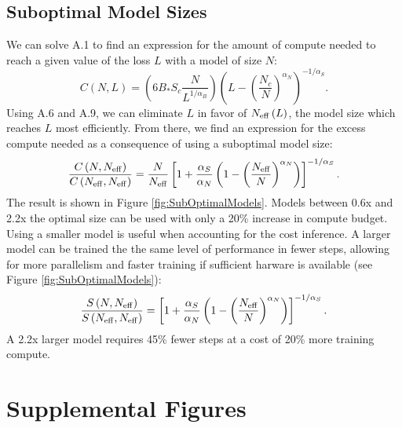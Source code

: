 \documentclass[english]{article}
\newcommand{\be}{\begin{equation}}
\newcommand{\ee}{\end{equation}}
\begin{document}
\subsection{Suboptimal Model Sizes}
\label{sec:suboptimal-models}
We can solve A.1 to find an expression for the amount of compute needed to reach a given value of the loss $L$ with a model of size $N$:
\be
C\left(N,L\right)=\left(6B_{\ast}S_{c}\frac{N}{L^{1/\alpha_{B}}}\right)\left(L-\left(\frac{N_{c}}{N}\right)^{\alpha_{N}}\right)^{-1/\alpha_{S}}.
\ee
Using A.6 and A.9, we can eliminate $L$ in favor of $N_{{\rm eff}}\left(L\right)$, the model size which reaches $L$ most efficiently. From there, we find an expression for the excess compute needed as a consequence of using a suboptimal model size: 
\be
\frac{C\left(N,N_{{\rm eff}}\right)}{C\left(N_{{\rm eff}},N_{{\rm eff}}\right)}=\frac{N}{N_{{\rm eff}}}\left[1+\frac{\alpha_{S}}{\alpha_{N}}\left(1-\left(\frac{N_{{\rm eff}}}{N}\right)^{\alpha_{N}}\right)\right]^{-1/\alpha_{S}}.
\ee
The result is shown in Figure \ref{fig:SubOptimalModels}. Models between 0.6x and 2.2x the optimal size can be used with only a 20\% increase in compute budget. Using a smaller model is useful when accounting for the cost inference. A larger model can be trained the the same level of performance in fewer steps, allowing for more parallelism and faster training if sufficient harware is available (see Figure \ref{fig:SubOptimalModels}):
\be
\frac{S\left(N,N_{{\rm eff}}\right)}{S\left(N_{{\rm eff}},N_{{\rm eff}}\right)}=\left[1+\frac{\alpha_{S}}{\alpha_{N}}\left(1-\left(\frac{N_{{\rm eff}}}{N}\right)^{\alpha_{N}}\right)\right]^{-1/\alpha_{S}}.
\ee
A 2.2x larger model requires 45\% fewer steps at a cost of 20\% more training compute.

\section{Supplemental  Figures}
\end{document}
